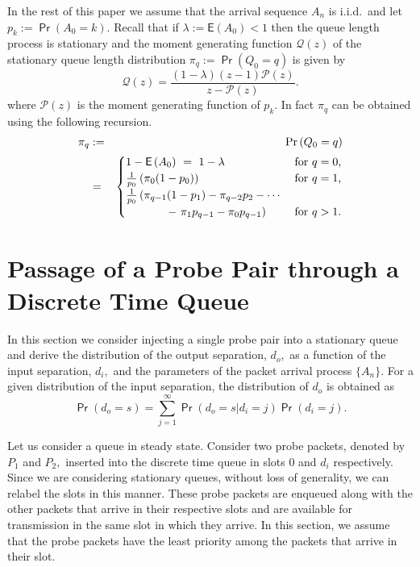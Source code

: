 \documentclass[11pt]{article}
\newcommand{\prob}[1]{\mathsf{\Pr}\left(#1\right)}
\newcommand{\EXP}[1]{\mathsf{E}\left(#1\right)}
\begin{document}
In the rest of this paper we assume that the arrival sequence $A_n$ is
i.i.d.~and let $p_k:=\prob{A_0=k}.$ Recall that if $\lambda:=\EXP{A_0}
< 1$ then the queue length process is stationary and the moment
generating function $\mathcal{Q}(z)$ of the stationary queue length
distribution $\pi_q:=\prob{Q_0=q}$ is given by
\begin{displaymath}
  \mathcal{Q}(z) =
  \frac{(1-\lambda)(z-1)\mathcal{P}(z)}{z-\mathcal{P}(z)} . 
\end{displaymath}
where $\mathcal{P}(z)$ is the moment generating function of $p_k.$  In
fact $\pi_q$ can be obtained using the following recursion.
\begin{eqnarray}
  \pi_q & := & \prob{Q_0=q} \nonumber \\
  &=& 
  \begin{cases} 
    1 - \EXP{A_0}  \ = \ 1 - \lambda & \mbox{for $q=0$,} \\
    \frac{1}{p_0}\left( \pi_0(1-p_0) \right) & \mbox{for $q=1$,} \\
    \frac{1}{p_0}\left( \pi_{q-1}(1-p_1) - \pi_{q-2} p_2 -
      \cdots \right. & \\
    \hspace{0.5in} \left. - \ \pi_1 p_{q-1} - \pi_0 p_{q-1}  \right) &
    \mbox{for $q > 1$.} 
  \end{cases} \nonumber \\
  \label{eq:pi_q-recursion}  
\end{eqnarray}


\section{Passage of a Probe Pair through a Discrete Time Queue}
\label{sec:output-dispersion}
In this section we consider injecting a single probe pair into a
stationary queue and derive the distribution of the output separation,
$d_o,$ as a function of the input separation, $d_i,$ and the
parameters of the packet arrival process $\{A_n\}.$ For a given
distribution of the input separation, the distribution of $d_o$ is
obtained as
\begin{equation}
  \label{eq:d_o-unconditional}
  \prob{d_o=s} =\sum_{j=1}^\infty \prob{d_o=s|d_i=j} \prob{d_i=j} . 
\end{equation}


Let us consider a queue in steady state. Consider two probe packets,
denoted by $P_1$ and $P_2,$ inserted into the discrete time queue in
slots $0$ and $d_i$ respectively. Since we are considering stationary
queues, without loss of generality, we can relabel the slots in this
manner. These probe packets are enqueued along with the other packets
that arrive in their respective slots and are available for
transmission in the same slot in which they arrive. In this section,
we assume that the probe packets have the least priority among the
packets that arrive in their slot.
\end{document}
